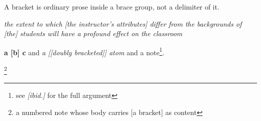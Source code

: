 A bracket is ordinary prose inside a brace group, not a delimiter of it.

\emph{the extent to which [the instructor's attributes] differ from the
backgrounds of [the] students will have a profound effect on the classroom}

\textbf{a [b] c} and \emph{a [[doubly bracketed]] atom} and a note\footnote{see
\emph{[ibid.]} for the full argument}.

\footnote[3]{a numbered note whose body carries [a bracket] as content}
